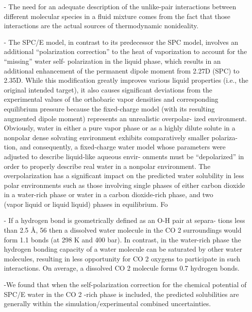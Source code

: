 - The need for an adequate description of the unlike-pair
interactions between diﬀerent molecular species in a ﬂuid
mixture comes from the fact that those interactions are the actual
sources of thermodynamic nonideality.

- The SPC/E model, in contrast to its predecessor the SPC
model, involves an additional “polarization correction” to the
heat of vaporization to account for the “missing” water self-
polarization in the liquid phase, which results in an additional
enhancement of the permanent dipole moment from 2.27D
(SPC) to 2.35D. While this modiﬁcation greatly improves
various liquid properties (i.e., the original intended target), it
also causes signiﬁcant deviations from the experimental values of
the orthobaric vapor densities and corresponding equilibrium
pressure because the ﬁxed-charge model (with its resulting
augmented dipole moment) represents an unrealistic overpolar-
ized environment. Obviously, water in either a
pure vapor phase or as a highly dilute solute in a nonpolar dense
solvating environment exhibits comparatively smaller polariza-
tion, and consequently, a ﬁxed-charge water model whose
parameters were adjusted to describe liquid-like aqueous envir-
onments must be “depolarized” in order to properly describe real
water in a nonpolar environment. The overpolarization has a signiﬁcant impact on the predicted water solubility in less polar environments such as those involving single phases of either carbon dioxide in a water-rich phase
or water in a carbon dioxide-rich phase, and two (vaporliquid
or liquidliquid) phases in equilibrium. Fo

- If a hydrogen bond is geometrically deﬁned as an O-H pair at separa-
tions less than 2.5 Å, 56 then a dissolved water molecule in the
CO 2 surroundings would form 1.1 bonds (at 298 K and 400
bar). In contrast, in the water-rich phase the hydrogen bonding
capacity of a water molecule can be saturated by other water
molecules, resulting in less opportunity for CO 2 oxygens to
participate in such interactions. On average, a dissolved CO 2
molecule forms 0.7 hydrogen bonds.

-We found that when the self-polarization correction for the chemical potential of SPC/E water in the CO 2 -rich phase is included, the predicted
solubilities are generally within the simulation/experimental
combined uncertainties.



